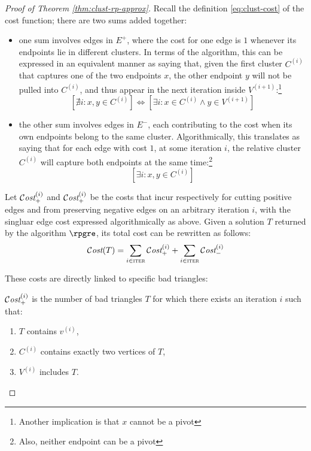\begin{proof}[Proof of Theorem \ref{thm:clust-rp-approx}]
    Recall the definition \ref{eq:clust-cost} of the cost function; there are two sums added together:
    
    \begin{itemize}
        \item one sum involves edges in $E^+$, where the cost for one edge is $1$ whenever its endpoints lie in different clusters. In terms of the algorithm, this can be expressed in an equivalent manner as saying that, given the first cluster $C^{(i)}$ that captures one of the two endpoints $x$, the other endpoint $y$ will not be pulled into $C^{(i)}$, and thus appear in the next iteration inside $V^{(i + 1)}$:\footnote{Another implication is that $x$ cannot be a pivot}
        \[
            \left[ \nexists i : x, y \in C^{(i)} \right] \iff \left[ \exists i : x \in C^{(i)} \wedge y \in V^{(i + 1)} \right]
        \]
        \item the other sum involves edges in $E^-$, each contributing to the cost when its own endpoints belong to the same cluster. Algorithmically, this translates as saying that for each edge with cost $1$, at some iteration $i$, the relative cluster $C^{(i)}$ will capture both endpoints at the same time:\footnote{Also, neither endpoint can be a pivot}
        \[
            \left[ \exists i : x, y \in C^{(i)} \right]
        \]
    \end{itemize}

    Let $\mathcal{C}\textit{ost}_+^{(i)}$ and $\mathcal{C}\textit{ost}_+^{(i)}$ be the costs that incur respectively for cutting positive edges and from preserving negative edges on an arbitrary iteration $i$, with the singluar edge cost expressed algorithmically as above. Given a solution $T$ returned by the algorithm $\rpgre$, its total cost can be rewritten as follows:
    \[
        \mathcal{C}\textit{ost}(T) = \sum_{i \in \textsc{iter}} \mathcal{C}\textit{ost}_+^{(i)} + \sum_{i \in \textsc{iter}} \mathcal{C}\textit{ost}_-^{(i)}
    \]

    These costs are directly linked to specific bad triangles:
    
    \begin{claim}\label{cl:clust-1}
        $\mathcal{C}\textit{ost}_+^{(i)}$ is the number of bad triangles $T$ for which there exists an iteration $i$ such that:
        \begin{enumerate}
            \item $T$ contains $v^{(i)}$,
            \item $C^{(i)}$ contains exactly two vertices of $T$,
            \item $V^{(i)}$ includes $T$.
        \end{enumerate}
    \end{claim}


\end{proof}
